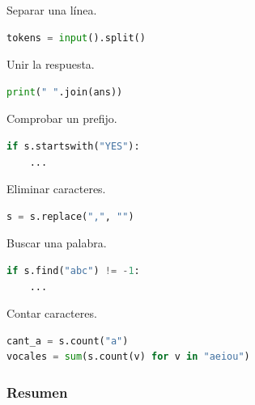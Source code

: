 Separar una línea.

\begin{lstlisting}[language=Python]
tokens = input().split()
\end{lstlisting}

Unir la respuesta.

\begin{lstlisting}[language=Python]
print(" ".join(ans))
\end{lstlisting}

Comprobar un prefijo.

\begin{lstlisting}[language=Python]
if s.startswith("YES"):
    ...
\end{lstlisting}

Eliminar caracteres.

\begin{lstlisting}[language=Python]
s = s.replace(",", "")
\end{lstlisting}

Buscar una palabra.

\begin{lstlisting}[language=Python]
if s.find("abc") != -1:
    ...
\end{lstlisting}

Contar caracteres.

\begin{lstlisting}[language=Python]
cant_a = s.count("a")
vocales = sum(s.count(v) for v in "aeiou")
\end{lstlisting}

\vspace{0.3cm}

\subsubsection*{Resumen}

